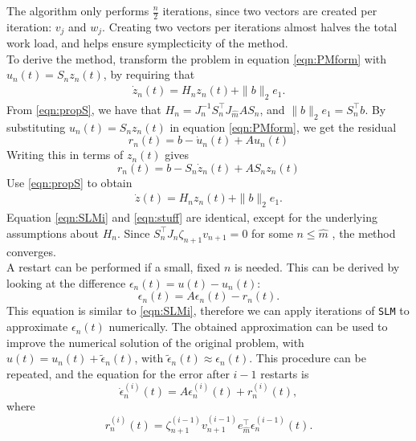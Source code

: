 \noindent The algorithm only performs $\frac{n}{2}$ iterations, since two vectors are created per iteration: $v_j$ and $w_j$. Creating two vectors per iterations almost halves the total work load, and helps ensure symplecticity of the method.\\

\noindent To derive the method, transform the problem in equation \eqref{eqn:PMform} with $u_n(t) = S_n z_n(t)$, by requiring that 
\begin{equation*}
\begin{aligned}
\dot{z}_n(t) = H_n z_n(t) + \|b\|_2 e_1.
\end{aligned}
\end{equation*}
From \eqref{eqn:propS}, we have that $H_n = J^{-1}_n S_n^\top J_{\hat{m}} A S_n$, and $ \|b\|_2 e_1 = S_n^\top b $. By substituting $u_n(t) = S_n z_n(t)$ in equation \eqref{eqn:PMform}, we get the residual
\begin{equation*}
r_n(t) = b - \dot{u}_n(t) + Au_n(t)
\end{equation*}
Writing this in terms of $z_n(t)$ gives
\begin{equation*}
r_n(t) = b-S_n \dot{z}_n(t) + AS_nz_n(t)
\end{equation*}
Use \eqref{eqn:propS} to obtain
\begin{equation}
\begin{aligned}
\dot{z}(t) = H_n z_n(t) + \|b \|_2 e_1.
\end{aligned}
\label{eqn:SLMi}
\end{equation}
Equation \eqref{eqn:SLMi} and \eqref{eqn:stuff} are identical, except for the underlying assumptions about $H_n$.
\noindent Since $ S_{n}^\top J_{n} \zeta_{n+1} v_{n+1} = 0 $ for some $n \leq \hat{m}$ \cite{SLMconv}, the method converges. \\

\noindent A restart can be performed if a small, fixed $n$ is needed. This can be derived by looking at the difference $ \epsilon_n(t) = u(t) - u_n(t)$: 
\begin{equation*}
\epsilon_n(t) = A \epsilon_n(t) - r_n(t).
\end{equation*}
This equation is similar to \eqref{eqn:SLMi}, therefore we can apply iterations of \texttt{SLM} to approximate $\epsilon_n(t)$ numerically. The obtained approximation can be used to improve the numerical solution of the original problem, with $u(t) = u_n(t) + \tilde{\epsilon}_n(t)$, with $\tilde{\epsilon}_n(t) \approx \epsilon_n(t)$. This procedure can be repeated, and the equation for the error after $i-1$ restarts is 
\begin{equation*}
\dot{\epsilon}_n^{(i)}(t) = A \epsilon_n^{(i)}(t) + r_n^{(i)}(t),
\end{equation*}
where
\begin{equation*}
r_n^{(i)}(t) = \zeta_{n+1}^{(i-1)} v_{n+1}^{(i-1)} e_{\hat{m}}^\top \epsilon_n^{(i-1)}(t).
\end{equation*}

